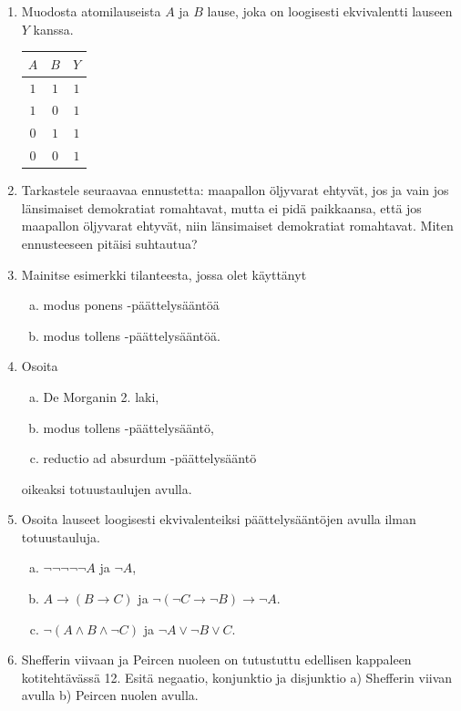 \begin{enumerate}
\item Muodosta atomilauseista $A$ ja $B$ lause, joka on
loogisesti ekvivalentti lauseen $Y$ kanssa.
\begin{center}
\begin{tabular}{|c|c|c|}\hline
$A$ & $B$ & $Y$\\ \hline
$1$ & $1$ & $1$\\
$1$ & $0$ & $1$\\
$0$ & $1$ & $1$\\

$0$ & $0$ & $1$\\ \hline
\end{tabular}
\end{center}

\item Tarkastele seuraavaa ennustetta: maapallon öljyvarat ehtyvät, jos ja vain jos länsimaiset demokratiat romahtavat, mutta ei pidä paikkaansa, että jos maapallon
öljyvarat ehtyvät, niin länsimaiset demokratiat romahtavat. Miten ennusteeseen pitäisi suhtautua?

\item Mainitse esimerkki tilanteesta, jossa olet käyttänyt
\begin{enumerate}[a)]
\item modus ponens -päättelysääntöä
\item modus tollens -päättelysääntöä.
\end{enumerate}

\item Osoita
\begin{enumerate}[a)]
\item De Morganin 2. laki,
\item modus tollens -päättelysääntö,
\item reductio ad absurdum -päättelysääntö
\end{enumerate}
oikeaksi totuustaulujen avulla.

\item Osoita lauseet loogisesti ekvivalenteiksi
päättelysääntöjen avulla ilman totuustauluja.
\begin{enumerate}[a)]
\item $\lnot \lnot \lnot \lnot \lnot A$ ja $\lnot A$,
\item $A \to (B \to C)$ ja $\lnot (\lnot C \to \lnot
B) \to \lnot A$.
\item $\lnot (A \land B \land \lnot C)$ ja $\lnot A
\lor \lnot B \lor C$.
\end{enumerate}

\item Shefferin viivaan ja Peircen nuoleen on tutustuttu
edellisen kappaleen kotitehtävässä 12. Esitä negaatio,
konjunktio ja disjunktio a) Shefferin viivan avulla b)
Peircen nuolen avulla.


\end{enumerate}
